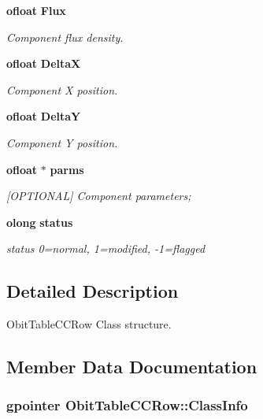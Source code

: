 \begin{CompactItemize}
{\bf ofloat} {\bf Flux}
\begin{CompactList}\small\item\em Component flux density. \item\end{CompactList}\item 
{\bf ofloat} {\bf Delta\-X}
\begin{CompactList}\small\item\em Component X position. \item\end{CompactList}\item 
{\bf ofloat} {\bf Delta\-Y}
\begin{CompactList}\small\item\em Component Y position. \item\end{CompactList}\item 
{\bf ofloat} $\ast$ {\bf parms}
\begin{CompactList}\small\item\em [OPTIONAL] Component parameters; \item\end{CompactList}\item 
{\bf olong} {\bf status}
\begin{CompactList}\small\item\em status 0=normal, 1=modified, -1=flagged \item\end{CompactList}\end{CompactItemize}


\subsection{Detailed Description}
Obit\-Table\-CCRow Class structure. 



\subsection{Member Data Documentation}
\subsubsection{\setlength{\rightskip}{0pt plus 5cm}gpointer {\bf Obit\-Table\-CCRow::Class\-Info}}\label{structObitTableCCRow_o1}


